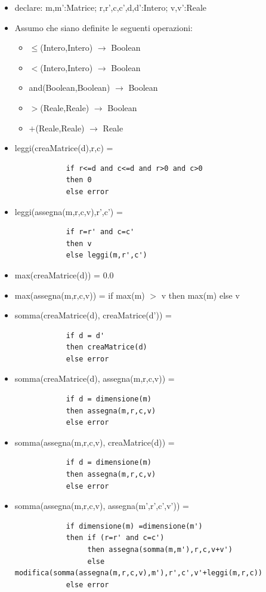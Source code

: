 \documentclass{article}
\begin{document}
	\begin{itemize}
		\item declare: m,m':Matrice; r,r',c,c',d,d':Intero; v,v':Reale
		\item Assumo che siano definite le seguenti operazioni:
		\begin{itemize}
			\item $\leq$(Intero,Intero) $\rightarrow$ Boolean
			\item $<$(Intero,Intero) $\rightarrow$ Boolean
			\item and(Boolean,Boolean) $\rightarrow$ Boolean
			\item $>$(Reale,Reale) $\rightarrow$ Boolean
			\item $+$(Reale,Reale) $\rightarrow$ Reale
		\end{itemize}
		\item leggi(creaMatrice(d),r,c) = 
		\begin{verbatim}
			if r<=d and c<=d and r>0 and c>0 
			then 0 
			else error
		\end{verbatim}
		\item leggi(assegna(m,r,c,v),r',c') =
		\begin{verbatim}
			if r=r' and c=c'
			then v
			else leggi(m,r',c')
		\end{verbatim}
		\item max(creaMatrice(d)) = 0.0
		\item max(assegna(m,r,c,v)) = if max(m) $>$ v then max(m) else v
		\item somma(creaMatrice(d), creaMatrice(d')) = 
		\begin{verbatim}
			if d = d' 
			then creaMatrice(d) 
			else error
		\end{verbatim}
		\item somma(creaMatrice(d), assegna(m,r,c,v)) = 
		\begin{verbatim}
			if d = dimensione(m) 
			then assegna(m,r,c,v)
			else error
		\end{verbatim}
		\item somma(assegna(m,r,c,v), creaMatrice(d)) =
		\begin{verbatim}
			if d = dimensione(m) 
			then assegna(m,r,c,v)
			else error
		\end{verbatim}		
		\item somma(assegna(m,r,c,v), assegna(m',r',c',v')) = 
		\begin{verbatim}
			if dimensione(m) =dimensione(m') 
			then if (r=r' and c=c') 
				 then assegna(somma(m,m'),r,c,v+v')
				 else modifica(somma(assegna(m,r,c,v),m'),r',c',v'+leggi(m,r,c))
			else error
		\end{verbatim}
	\end{itemize}
\end{document}
